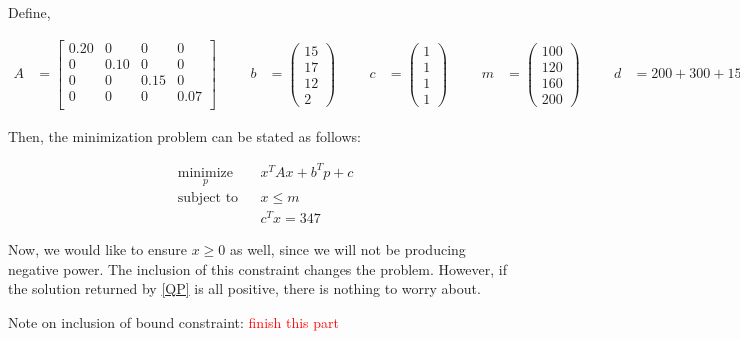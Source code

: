 \documentclass{article}
\begin{document}
Define,

\begin{align*}
A &= 
\begin{bmatrix}
	0.20 & 0 & 0 & 0  \\ 
	0 & 0.10 & 0 & 0  \\ 
	0 & 0 & 0.15 & 0  \\ 
	0 & 0 & 0 & 0.07  \\ 
\end{bmatrix}
& & &
b &= \begin{pmatrix}
15 \\ 17 \\ 12 \\ 2
\end{pmatrix}
& & &
c &= \begin{pmatrix}
1 \\ 1 \\ 1 \\ 1
\end{pmatrix}
& & &
m &= \begin{pmatrix}
100 \\ 120 \\ 160 \\ 200
\end{pmatrix}
& & &
d &= 200 +300+150+500 = 1150
\end{align*}

Then, the minimization problem can be stated as follows:

\begin{equation}\label{QP}
\begin{aligned}
& \underset{p}{\text{minimize}}
& & x^TAx + b^Tp + c \\
& \text{subject to}
& &  x \le m\\
&&& c^Tx = 347
\end{aligned}
\end{equation}

Now, we would like to ensure $x\ge 0$ as well, since we will not be producing negative power.  The inclusion of this constraint changes the problem.  However, if the solution returned by \eqref{QP} is all positive, there is nothing to worry about.

Note on inclusion of bound constraint:
\textcolor{red}{finish this part}



\end{document}
